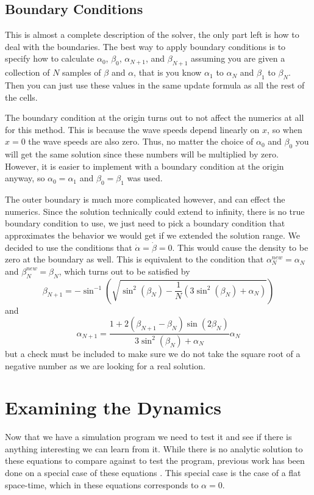 \documentclass[12pt]{article}
\begin{document}
\subsection{Boundary Conditions}

This is almost a complete description of the solver, the only part left is how to deal
with the boundaries. The best way to apply boundary conditions is to specify how to
calculate $\alpha_0$, $\beta_0$, $\alpha_{N+1}$, and $\beta_{N+1}$ assuming you are
given a collection of $N$ samples of $\beta$ and $\alpha$, that is you know $\alpha_1$
to $\alpha_N$ and $\beta_1$ to $\beta_N$. Then you can just use these values in the same
update formula as all the rest of the cells.

The boundary condition at the origin turns out to not affect the numerics at all for
this method. This is because the wave speeds depend linearly on $x$, so when $x=0$ the
wave speeds are also zero. Thus, no matter the choice of $\alpha_0$ and $\beta_0$ you
will get the same solution since these numbers will be multiplied by zero. However, it
is easier to implement with a boundary condition at the origin anyway, so
$\alpha_0=\alpha_1$ and $\beta_0=\beta_1$ was used.

The outer boundary is much more complicated however, and can effect the numerics. Since
the solution technically could extend to infinity, there is no true boundary condition
to use, we just need to pick a boundary condition that approximates the behavior we
would get if we extended the solution range. We decided to use the conditions that
$\dot{\alpha} = \dot{\beta} = 0$. This would cause the density to be zero at the
boundary as well. This is equivalent to the condition that $\alpha_N^{new} = \alpha_N$
and $\beta_N^{new} = \beta_N$, which turns out to be satisfied by
\[ \beta_{N+1} = -\sin^{-1}\left( \sqrt{\sin^2(\beta_N) - \frac{1}{N}
(3\sin^2(\beta_N) + \alpha_N)} \right) \]
and
\[ \alpha_{N+1} = \frac{1 + 2 (\beta_{N+1} - \beta_N) \sin(2\beta_N)}{3\sin^2(\beta_N) +
\alpha_N} \alpha_N \]
but a check must be included to make sure we do not take the square root of a negative
number as we are looking for a real solution.

\section{Examining the Dynamics}

Now that we have a simulation program we need to test it and see if there is anything
interesting we can learn from it. While there is no analytic solution to these equations
to compare against to test the program, previous work has been done on a special case of
these equations \cite{lqg2, lqg1}. This special case is the case of a flat space-time,
which in these equations corresponds to $\alpha = 0$.
\end{document}
